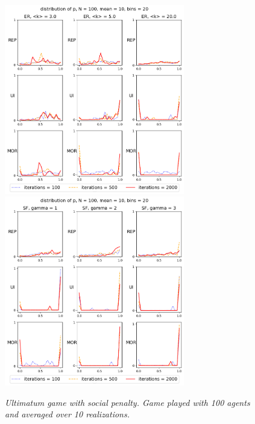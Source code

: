 \begin{figure}[H]
\begin{center}
	\includegraphics[width=0.7\textwidth]{soc3.png}
	\includegraphics[width=0.7\textwidth]{soc4.png}
 
	\caption{\emph{ Ultimatum game with social penalty.  Game played with 100 agents and averaged over 10 realizations. }}
	\label{nosoc2}
\end{center}
\end{figure}

\newpage